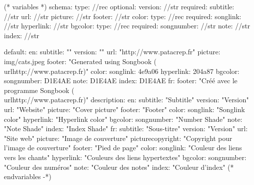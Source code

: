 
(* variables *)
schema:
  type: //rec
  optional:
    version: //str
  required:
    subtitle: //str
    url: //str
    picture: //str
    footer: //str
    color:
      type: //rec
      required:
        songlink: //str
        hyperlink: //str
    bgcolor:
      type: //rec
      required:
        songnumber: //str
        note: //str
        index: //str

default:
  en:
    subtitle: ""
    version: ""
    url: "http://www.patacrep.fr"
    picture: img/cats.jpeg
    footer: "Generated using Songbook (\\url{http://www.patacrep.fr})"
    color:
      songlink: 4e9a06
      hyperlink: 204a87
    bgcolor:
      songnumber: D1E4AE
      note: D1E4AE
      index: D1E4AE
  fr:
    footer: "Créé avec le programme Songbook (\\url{http://www.patacrep.fr})"
description:
  en:
    subtitle: "Subtitle"
    version: "Version"
    url: "Website"
    picture: "Cover picture"
    footer: "Footer"
    color:
      songlink: "Songlink color"
      hyperlink: "Hyperlink color"
    bgcolor:
      songnumber: "Number Shade"
      note: "Note Shade"
      index: "Index Shade"
  fr:
    subtitle: "Sous-titre"
    version: "Version"
    url: "Site web"
    picture: "Image de couverture"
    picturecopyright: "Copyright pour l'image de couverture"
    footer: "Pied de page"
    color:
      songlink: "Couleur des liens vers les chants"
      hyperlink: "Couleurs des liens hypertextes"
    bgcolor:
      songnumber: "Couleur des numéros"
      note: "Couleur des notes"
      index: "Couleur d'index"
(* endvariables -*)

